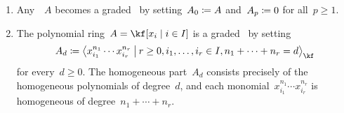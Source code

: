 \begin{examples}
	\label{examples for graded algebras}
	\leavevmode
	\begin{enumerate}
		\item
			Any~\algebra{$\kf$}~$A$ becomes a graded~\algebra{$\kf$} by setting~$A_0 \coloneqq A$ and~$A_p \coloneqq 0$ for all~$p \geq 1$.
		\item
			The polynomial ring~$A = \kf[x_i \suchthat i \in I]$ is a graded~\algebra{$\kf$} by setting
			\[
				A_d
				\defined
				\gen[\big]{
					x_{i_1}^{n_1} \dotsm x_{i_r}^{n_r}
				\suchthat[\big]
					r \geq 0,
					i_1, \dotsc, i_r \in I,
					n_1 + \dotsb + n_r = d
				}_{\kf}
			\]
			for every~$d \geq 0$.
			The homogeneous part~$A_d$ consists precisely of the homogeneous polynomials of degree~$d$, and each monomial~$x_{i_1}^{n_1} \dotsm x_{i_r}^{n_r}$ is homogeneous of degree~$n_1 + \dotsb + n_r$.
			

\end{enumerate}
\end{examples}
